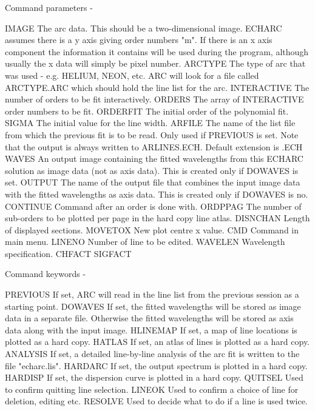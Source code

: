 \begin{description}
\begin{description}
\begin{terminalv}
 Command parameters -

 IMAGE        The arc data.  This should be a two-dimensional
              image. ECHARC assumes there is a y axis giving
              order numbers "m". If there is an x axis
              component the information it contains will be
              used during the program, although usually the
              x data will simply be pixel number.
 ARCTYPE      The type of arc that was used - e.g. HELIUM,
              NEON, etc.  ARC will look for a file called
              ARCTYPE.ARC which should hold the line list for
              the arc.
 INTERACTIVE  The number of orders to be fit interactively.
 ORDERS       The array of INTERACTIVE order numbers to be fit.
 ORDERFIT     The initial order of the polynomial fit.
 SIGMA        The initial value for the line width.
 ARFILE       The name of the list file from which the previous
              fit is to be read.  Only used if PREVIOUS is
              set.  Note that the output is always written
              to ARLINES.ECH.  Default extension is .ECH
 WAVES        An output image containing the fitted wavelengths
              from this ECHARC solution as image data (not as axis
              data). This is created only if DOWAVES is set.
 OUTPUT       The name of the output file that combines the input
              image data with the fitted wavelengths as axis
              data. This is created only if DOWAVES is no.
 CONTINUE     Command after an order is done with.
 ORDPPAG      The number of sub-orders to be plotted per page in
              the hard copy line atlas.
 DISNCHAN     Length of displayed sections.
 MOVETOX      New plot centre x value.
 CMD          Command in main menu.
 LINENO       Number of line to be edited.
 WAVELEN      Wavelength specification.
 CHFACT
 SIGFACT

 Command keywords -

 PREVIOUS     If set, ARC will read in the line list from
              the previous session as a starting point.
 DOWAVES      If set, the fitted wavelengths will be stored
              as image data in a separate file. Otherwise the
              fitted wavelengths will be stored as axis data along
              with the input image.
 HLINEMAP     If set, a map of line locations is plotted as
              a hard copy.
 HATLAS       If set, an atlas of lines is plotted as a
              hard copy.
 ANALYSIS     If set, a detailed line-by-line analysis of the
              arc fit is written to the file "echarc.lis".
 HARDARC      If set, the output spectrum is plotted in a
              hard copy.
 HARDISP      If set, the dispersion curve is plotted in a
              hard copy.
 QUITSEL      Used to confirm quitting line selection.
 LINEOK       Used to confirm a choice of line for deletion,
              editing etc.
 RESOLVE      Used to decide what to do if a line is used twice.


\end{terminalv}
\end{description}
\end{description}
